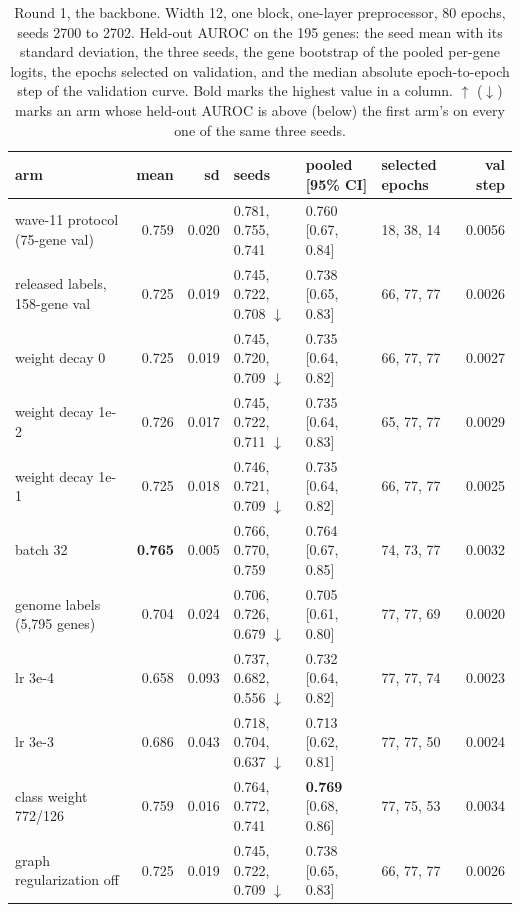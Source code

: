 \begin{table}[H]
  \centering
  \footnotesize
  \caption[Round 1, the backbone]{Round 1, the backbone. Width 12, one block, one-layer preprocessor, 80 epochs, seeds 2700 to 2702. Held-out AUROC on the 195 genes: the seed mean with its standard deviation, the three seeds, the gene bootstrap of the pooled per-gene logits, the epochs selected on validation, and the median absolute epoch-to-epoch step of the validation curve. Bold marks the highest value in a column. $\uparrow$ ($\downarrow$) marks an arm whose held-out AUROC is above (below) the first arm's on every one of the same three seeds.}
  \label{tab:w12}
  \begin{tabular}{@{}lrrlllr@{}}
    \hline
    arm & mean & sd & seeds & pooled [95\% CI] & selected epochs & val step \\
    \hline
    wave-11 protocol (75-gene val) & 0.759 & 0.020 & 0.781, 0.755, 0.741 & 0.760 [0.67, 0.84] & 18, 38, 14 & 0.0056 \\
    released labels, 158-gene val & 0.725 & 0.019 & 0.745, 0.722, 0.708 $\downarrow$ & 0.738 [0.65, 0.83] & 66, 77, 77 & 0.0026 \\
    weight decay 0 & 0.725 & 0.019 & 0.745, 0.720, 0.709 $\downarrow$ & 0.735 [0.64, 0.82] & 66, 77, 77 & 0.0027 \\
    weight decay 1e-2 & 0.726 & 0.017 & 0.745, 0.722, 0.711 $\downarrow$ & 0.735 [0.64, 0.83] & 65, 77, 77 & 0.0029 \\
    weight decay 1e-1 & 0.725 & 0.018 & 0.746, 0.721, 0.709 $\downarrow$ & 0.735 [0.64, 0.82] & 66, 77, 77 & 0.0025 \\
    batch 32 & \textbf{0.765} & 0.005 & 0.766, 0.770, 0.759 & 0.764 [0.67, 0.85] & 74, 73, 77 & 0.0032 \\
    genome labels (5,795 genes) & 0.704 & 0.024 & 0.706, 0.726, 0.679 $\downarrow$ & 0.705 [0.61, 0.80] & 77, 77, 69 & 0.0020 \\
    lr 3e-4 & 0.658 & 0.093 & 0.737, 0.682, 0.556 $\downarrow$ & 0.732 [0.64, 0.82] & 77, 77, 74 & 0.0023 \\
    lr 3e-3 & 0.686 & 0.043 & 0.718, 0.704, 0.637 $\downarrow$ & 0.713 [0.62, 0.81] & 77, 77, 50 & 0.0024 \\
    class weight 772/126 & 0.759 & 0.016 & 0.764, 0.772, 0.741 & \textbf{0.769} [0.68, 0.86] & 77, 75, 53 & 0.0034 \\
    graph regularization off & 0.725 & 0.019 & 0.745, 0.722, 0.709 $\downarrow$ & 0.738 [0.65, 0.83] & 66, 77, 77 & 0.0026 \\
    \hline
  \end{tabular}
\end{table}
